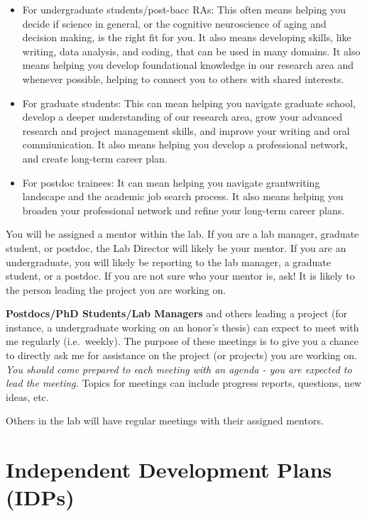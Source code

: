 \documentclass[]{book}
\begin{document}
\begin{itemize}
\item
  For undergraduate students/post-bacc RAs: This often means helping you decide if science in general, or the cognitive neuroscience of aging and decision making, is the right fit for you. It also means developing skills, like writing, data analysis, and coding, that can be used in many domains. It also means helping you develop foundational knowledge in our research area and whenever possible, helping to connect you to others with shared interests.
\item
  For graduate students: This can mean helping you navigate graduate school, develop a deeper understanding of our research area, grow your advanced research and project management skills, and improve your writing and oral commiunication. It also means helping you develop a professional network, and create long-term career plan.
\item
  For postdoc trainees: It can mean helping you navigate grantwriting landscape and the academic job search process. It also means helping you broaden your professional network and refine your long-term career plans.
\end{itemize}

You will be assigned a mentor within the lab. If you are a lab manager, graduate student, or postdoc, the Lab Director will likely be your mentor. If you are an undergraduate, you will likely be reporting to the lab manager, a graduate student, or a postdoc. If you are not sure who your mentor is, ask! It is likely to the person leading the project you are working on.

\textbf{Postdocs/PhD Students/Lab Managers} and others leading a project (for instance, a undergraduate working on an honor's thesis) can expect to meet with me regularly (i.e.~weekly). The purpose of these meetings is to give you a chance to directly ask me for assistance on the project (or projects) you are working on. \emph{You should come prepared to each meeting with an agenda - you are expected to lead the meeting.} Topics for meetings can include progress reports, questions, new ideas, etc.

Others in the lab will have regular meetings with their assigned mentors.

\hypertarget{independent-development-plans-idps}{%
\section{Independent Development Plans (IDPs)}\label{independent-development-plans-idps}}
\end{document}
